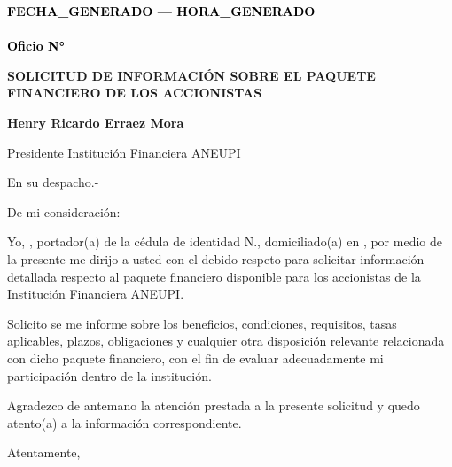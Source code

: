 \documentclass[a4paper,12pt]{article}
\begin{document}
\pagestyle{empty}

\vspace*{-5.5cm}
\begin{flushright}
{\footnotesize \textcolor{black}{\textbf{{{FECHA_GENERADO}} --- {{{HORA_GENERADO}}}}}} \\[-10pt] %
{\footnotesize \textcolor{black}{\underline{\hspace{7.5cm}}}} \\[-2pt] %
{\footnotesize \textcolor{black}{\textbf{Oficio N° }}} 
\end{flushright}


\vspace{2.5cm}
\noindent
\hspace*{\dimexpr\textwidth+1cm\relax}


\begin{center}
    \textbf{\large SOLICITUD DE INFORMACIÓN SOBRE EL PAQUETE FINANCIERO DE LOS ACCIONISTAS}
\end{center}

\vspace{0.8cm}

\noindent \textbf{Henry Ricardo Erraez Mora} 

\noindent Presidente Institución Financiera ANEUPI 

\noindent En su despacho.-

\vspace{1cm}

\noindent De mi consideración:

\noindent Yo, \textbf{\underline{\hspace{6cm}}}, portador(a) de la cédula de identidad N.\textbf{\underline{\hspace{4cm}}}, domiciliado(a) en \textbf{\underline{\hspace{8cm}}}, por medio de la presente me dirijo a usted con el debido respeto para solicitar información detallada respecto al paquete financiero disponible para los accionistas de la Institución Financiera ANEUPI.

\vspace{0.5cm}

\noindent Solicito se me informe sobre los beneficios, condiciones, requisitos, tasas aplicables, plazos, obligaciones y cualquier otra disposición relevante relacionada con dicho paquete financiero, con el fin de evaluar adecuadamente mi participación dentro de la institución.

\vspace{0.5cm}

\noindent Agradezco de antemano la atención prestada a la presente solicitud y quedo atento(a) a la información correspondiente.

\noindent Atentamente,

\vspace{2.5cm}


\noindent{}  

\noindent{}      

\noindent{}  

\noindent{} 
\end{document}
